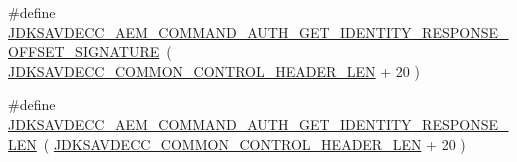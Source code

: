 \begin{DoxyCompactItemize}
\item 
\#define \hyperlink{group__command__auth__get__identity__response_gafbebf6476c805b5362c793563fc27e48}{J\+D\+K\+S\+A\+V\+D\+E\+C\+C\+\_\+\+A\+E\+M\+\_\+\+C\+O\+M\+M\+A\+N\+D\+\_\+\+A\+U\+T\+H\+\_\+\+G\+E\+T\+\_\+\+I\+D\+E\+N\+T\+I\+T\+Y\+\_\+\+R\+E\+S\+P\+O\+N\+S\+E\+\_\+\+O\+F\+F\+S\+E\+T\+\_\+\+S\+I\+G\+N\+A\+T\+U\+RE}~( \hyperlink{group__jdksavdecc__avtp__common__control__header_gaae84052886fb1bb42f3bc5f85b741dff}{J\+D\+K\+S\+A\+V\+D\+E\+C\+C\+\_\+\+C\+O\+M\+M\+O\+N\+\_\+\+C\+O\+N\+T\+R\+O\+L\+\_\+\+H\+E\+A\+D\+E\+R\+\_\+\+L\+EN} + 20 )
\item 
\#define \hyperlink{group__command__auth__get__identity__response_gadbc33a846185a4f56131e8677ae3366f}{J\+D\+K\+S\+A\+V\+D\+E\+C\+C\+\_\+\+A\+E\+M\+\_\+\+C\+O\+M\+M\+A\+N\+D\+\_\+\+A\+U\+T\+H\+\_\+\+G\+E\+T\+\_\+\+I\+D\+E\+N\+T\+I\+T\+Y\+\_\+\+R\+E\+S\+P\+O\+N\+S\+E\+\_\+\+L\+EN}~( \hyperlink{group__jdksavdecc__avtp__common__control__header_gaae84052886fb1bb42f3bc5f85b741dff}{J\+D\+K\+S\+A\+V\+D\+E\+C\+C\+\_\+\+C\+O\+M\+M\+O\+N\+\_\+\+C\+O\+N\+T\+R\+O\+L\+\_\+\+H\+E\+A\+D\+E\+R\+\_\+\+L\+EN} + 20 )
\end{DoxyCompactItemize}
